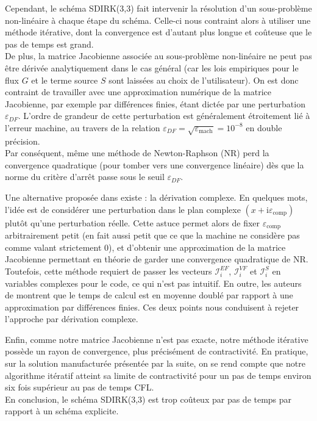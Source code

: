 \documentclass[11pt, a4paper, oneside]{report}
\begin{document}
Cependant, le schéma SDIRK(3,3) fait intervenir la résolution d'un sous-problème non-linéaire à chaque étape du schéma. Celle-ci nous contraint alors à utiliser une méthode itérative, dont la convergence est d'autant plus longue et coûteuse que le pas de temps est grand. \\
De plus, la matrice Jacobienne associée au sous-problème non-linéaire ne peut pas être dérivée analytiquement dans le cas général (car les lois empiriques pour le flux $G$ et le terme source $S$ sont laissées au choix de l'utilisateur). On est donc contraint de travailler avec une approximation numérique de la matrice Jacobienne, par exemple par différences finies, étant dictée par une perturbation $\varepsilon_{DF}$. L'ordre de grandeur de cette perturbation est généralement étroitement lié à l'erreur machine, au travers de la relation $\varepsilon_{DF} = \sqrt{\varepsilon_\text{mach}} = 10^{-8}$ en double précision. \\
Par conséquent, même une méthode de Newton-Raphson (NR) perd la convergence quadratique (pour tomber vers une convergence linéaire) dès que la norme du critère d'arrêt passe sous le seuil $\varepsilon_{DF}$.

Une alternative proposée dans \cite{martins2003complex} existe : la dérivation complexe. En quelques mots, l'idée est de considérer une perturbation dans le plan complexe $(x + \mathrm{i}\varepsilon_\text{comp})$ plutôt qu'une perturbation réelle. Cette astuce permet alors de fixer $\varepsilon_\text{comp}$ arbitrairement petit (en fait aussi petit que ce que la machine ne considère pas comme valant strictement 0), et d'obtenir une approximation de la matrice Jacobienne permettant en théorie de garder une convergence quadratique de NR. \\
Toutefois, cette méthode requiert de passer les vecteurs $\bm{\mathcal{I}}_i^{EF}$, $\bm{\mathcal{I}}_i^{VF}$ et $\bm{\mathcal{I}}_i^{S}$ en variables complexes pour le code, ce qui n'est pas intuitif. En outre, les auteurs de \cite{martins2003complex} montrent que le temps de calcul est en moyenne doublé par rapport à une approximation par différences finies. Ces deux points nous conduisent à rejeter l'approche par dérivation complexe.

Enfin, comme notre matrice Jacobienne n'est pas exacte, notre méthode itérative possède un rayon de convergence, plus précisément de contractivité. En pratique, sur la solution manufacturée présentée par la suite, on se rend compte que notre algorithme itératif atteint sa limite de contractivité pour un pas de temps environ six fois supérieur au pas de temps CFL. \\
En conclusion, le schéma SDIRK(3,3) est trop coûteux par pas de temps par rapport à un schéma explicite. \\
\end{document}
